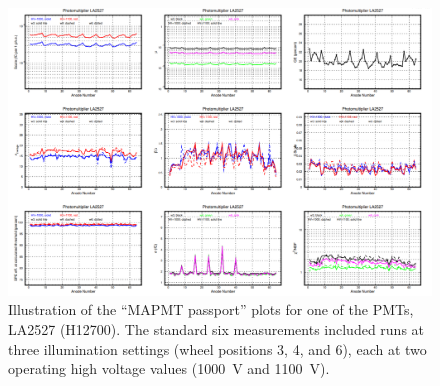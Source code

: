 \begin{figure}[!ht]
	\centering
	\includegraphics[width=1.0\textwidth,height=.7\textwidth]{figures/pavel_temp/LA2527_passport_temp.png}
	\caption{Illustration of the ``MAPMT passport'' plots for one of the PMTs, LA2527 (H12700). The standard six measurements included runs at three illumination settings (wheel positions 3, 4, and 6), each at two operating high voltage values (1000~V and 1100~V).}
	\label{fig:LA2527_passport}
\end{figure}
